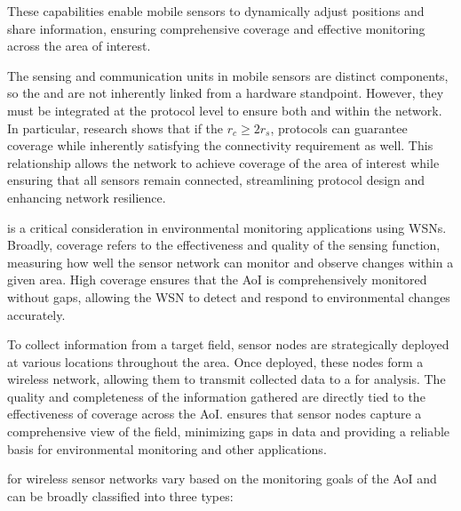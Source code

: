 \documentclass[a4paper, 12pt]{report}
\begin{document}
    These capabilities enable mobile sensors to dynamically adjust positions and share information, ensuring comprehensive coverage and effective monitoring across the area of interest.

    The sensing and communication units in mobile sensors are distinct components, so the  and  are not inherently linked from a hardware standpoint. However, they must be integrated at the protocol level to ensure both  and  within the network. In particular, research shows that if the $r_c \ge 2 r_s$, protocols can guarantee coverage while inherently satisfying the connectivity requirement as well. This relationship allows the network to achieve  coverage of the area of interest while ensuring that all sensors remain connected, streamlining protocol design and enhancing network resilience.

     is a critical consideration in environmental monitoring applications using WSNs. Broadly, coverage refers to the effectiveness and quality of the sensing function, measuring how well the sensor network can monitor and observe changes within a given area. High coverage ensures that the AoI is comprehensively monitored without gaps, allowing the WSN to detect and respond to environmental changes accurately.

    To collect information from a target field, sensor nodes are strategically deployed at various locations throughout the area. Once deployed, these nodes form a wireless network, allowing them to transmit collected data to a  for analysis. The quality and completeness of the information gathered are directly tied to the effectiveness of coverage across the AoI.  ensures that sensor nodes capture a comprehensive view of the field, minimizing gaps in data and providing a reliable basis for environmental monitoring and other applications.

     for wireless sensor networks vary based on the monitoring goals of the AoI and can be broadly classified into three types:
\end{document}
